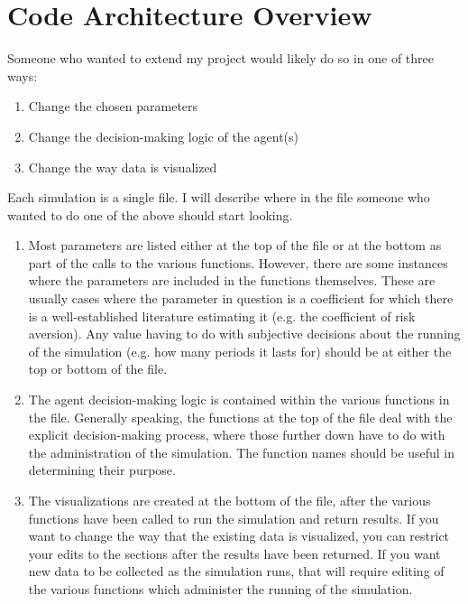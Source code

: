 \documentclass[10pt,twocolumn]{article}
\begin{document}
\section{Code Architecture Overview}
Someone who wanted to extend my project would likely do so in one of three ways:
\begin{enumerate}
    \item Change the chosen parameters
    \item Change the decision-making logic of the agent(s)
    \item Change the way data is visualized
\end{enumerate}
Each simulation is a single file. I will describe where in the file someone who wanted to do one of the above should start looking. 
\begin{enumerate}
    \item Most parameters are listed either at the top of the file or at the bottom as part of the calls to the various functions. However, there are some instances where the parameters are included in the functions themselves. These are usually cases where the parameter in question is a coefficient for which there is a well-established literature estimating it (e.g. the coefficient of risk aversion). Any value having to do with subjective decisions about the running of the simulation (e.g. how many periods it lasts for) should be at either the top or bottom of the file. 
    \item The agent decision-making logic is contained within the various functions in the file. Generally speaking, the functions at the top of the file deal with the explicit decision-making process, where those further down have to do with the administration of the simulation. The function names should be useful in determining their purpose. 
    \item The visualizations are created at the bottom of the file, after the various functions have been called to run the simulation and return results. If you want to change the way that the existing data is visualized, you can restrict your edits to the sections after the results have been returned. If you want new data to be collected as the simulation runs, that will require editing of the various functions which administer the running of the simulation.
\end{enumerate}
\end{document}
